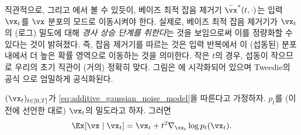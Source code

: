 \documentclass[../../book-main_ko.tex]{subfiles}
\begin{document}
직관적으로, 그리고 에서 볼 수 있듯이, 베이즈 최적 잡음 제거기 \(\bar{\vx}^{\ast}(t, \cdot)\)는 입력 \(\vx_{t}\)를 \(\vx\) 분포의 모드로 이동시켜야 한다. 실제로, 베이즈 최적 잡음 제거기가 \(\vx_{t}\)의 (로그) 밀도에 대해 \textit{경사 상승 단계를 취한다}는 것을 보임으로써 이를 정량화할 수 있다는 것이 밝혀졌다. 즉, 잡음 제거기를 따르는 것은 입력 반복에서 이 (섭동된) 분포 내에서 더 높은 확률 영역으로 이동하는 것을 의미한다. 작은 \(t\)의 경우, 섭동이 작으므로 우리의 초기 직관이 (거의) 정확히 맞다. 그림은 에 시각화되어 있으며 Tweedie의 공식 \cite{Robbins1956AnEB}으로 엄밀하게 공식화된다.
\begin{theorem}[Tweedie의 공식]\label{thm:tweedie}
	\((\vx_{t})_{t \in [0, T]}\)가 \eqref{eq:additive_gaussian_noise_model}을 따른다고 가정하자. \(p_{t}\)를 (이전에 선언한 대로) \(\vx_{t}\)의 밀도라고 하자. 그러면
	\begin{equation}\label{eq:tweedie}
		\Ex[\vx \mid \vx_{t}] = \vx_{t} + t^{2}\nabla_{\vx_{t}} \log p_{t}(\vx_{t}).
	\end{equation}
\end{theorem}
\end{document}
